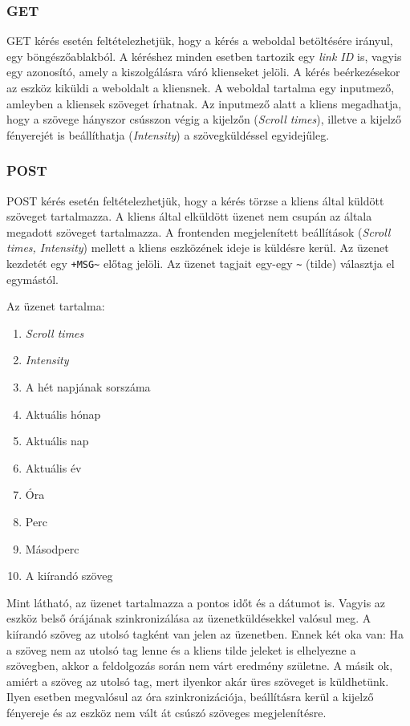 \documentclass[a4paper, 12pt]{article}
\begin{document}
\subsubsection{GET}

GET kérés esetén feltételezhetjük, hogy a kérés a weboldal betöltésére irányul, egy böngészőablakból. A kéréshez minden esetben tartozik egy \textit{link ID} is, vagyis egy azonosító, amely a kiszolgálásra váró klienseket jelöli. A kérés beérkezésekor az eszköz kiküldi a weboldalt a kliensnek. A weboldal tartalma egy inputmező, amleyben a kliensek szöveget írhatnak. Az inputmező alatt a kliens megadhatja, hogy a szövege hányszor csússzon végig a kijelzőn (\textit{Scroll times}), illetve a kijelző fényerejét is beállíthatja (\textit{Intensity}) a szövegküldéssel egyidejűleg.

\subsubsection{POST}

POST kérés esetén feltételezhetjük, hogy a kérés törzse a kliens által küldött szöveget tartalmazza.
A kliens által elküldött üzenet nem csupán az általa megadott szöveget tartalmazza. A frontenden megjelenített beállítások (\textit{Scroll times, Intensity}) mellett a kliens eszközének ideje is küldésre kerül.
Az üzenet kezdetét egy \texttt{+MSG\~} előtag jelöli. Az üzenet tagjait egy-egy \texttt{\~} (tilde) választja el egymástól.

Az üzenet tartalma:
\begin{enumerate}[nolistsep]
 \item \textit{Scroll times}
 \item \textit{Intensity}
 \item A hét napjának sorszáma
 \item Aktuális hónap
 \item Aktuális nap
 \item Aktuális év
 \item Óra
 \item Perc
 \item Másodperc
 \item A kiírandó szöveg 
\end{enumerate}

Mint látható, az üzenet tartalmazza a pontos időt és a dátumot is. Vagyis az eszköz belső órájának szinkronizálása az üzenetküldésekkel valósul meg. A kiírandó szöveg az utolsó tagként van jelen az üzenetben. Ennek két oka van: Ha a szöveg nem az utolsó tag lenne és a kliens tilde jeleket is elhelyezne a szövegben, akkor a feldolgozás során nem várt eredmény születne. A másik ok, amiért a szöveg az utolsó tag, mert ilyenkor akár üres szöveget is küldhetünk. Ilyen esetben megvalósul az óra szinkronizációja, beállításra kerül a kijelző fényereje és az eszköz nem vált át csúszó szöveges megjelenítésre.
\end{document}
